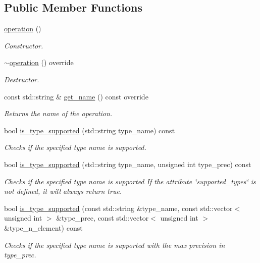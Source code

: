 \subsection*{Public Member Functions}
\begin{DoxyCompactItemize}
\item 
\hyperlink{structoperation_ad4625adf0914d5c4dd25b1710703b642}{operation} ()
\begin{DoxyCompactList}\small\item\em Constructor. \end{DoxyCompactList}\item 
\hyperlink{structoperation_aa513f0c61b49ef30a3a8b49fc3eb5874}{$\sim$operation} () override
\begin{DoxyCompactList}\small\item\em Destructor. \end{DoxyCompactList}\item 
const std\+::string \& \hyperlink{structoperation_af507cadd6f2ee17b88e7cb62772fe1f2}{get\+\_\+name} () const override
\begin{DoxyCompactList}\small\item\em Returns the name of the operation. \end{DoxyCompactList}\item 
bool \hyperlink{structoperation_a271a2bcd8bf499be5df7ae05edb8b64f}{is\+\_\+type\+\_\+supported} (std\+::string type\+\_\+name) const
\begin{DoxyCompactList}\small\item\em Checks if the specified type name is supported. \end{DoxyCompactList}\item 
bool \hyperlink{structoperation_a34a78778569a0ff97520b3148ec21521}{is\+\_\+type\+\_\+supported} (std\+::string type\+\_\+name, unsigned int type\+\_\+prec) const
\begin{DoxyCompactList}\small\item\em Checks if the specified type name is supported If the attribute \char`\"{}supported\+\_\+types\char`\"{} is not defined, it will always return true. \end{DoxyCompactList}\item 
bool \hyperlink{structoperation_a2fbbfb27340dda2d4b29952781b32150}{is\+\_\+type\+\_\+supported} (const std\+::string \&type\+\_\+name, const std\+::vector$<$ unsigned int $>$ \&type\+\_\+prec, const std\+::vector$<$ unsigned int $>$ \&type\+\_\+n\+\_\+element) const
\begin{DoxyCompactList}\small\item\em Checks if the specified type name is supported with the max precision in type\+\_\+prec. \end{DoxyCompactList}\item 

\end{DoxyCompactItemize}
